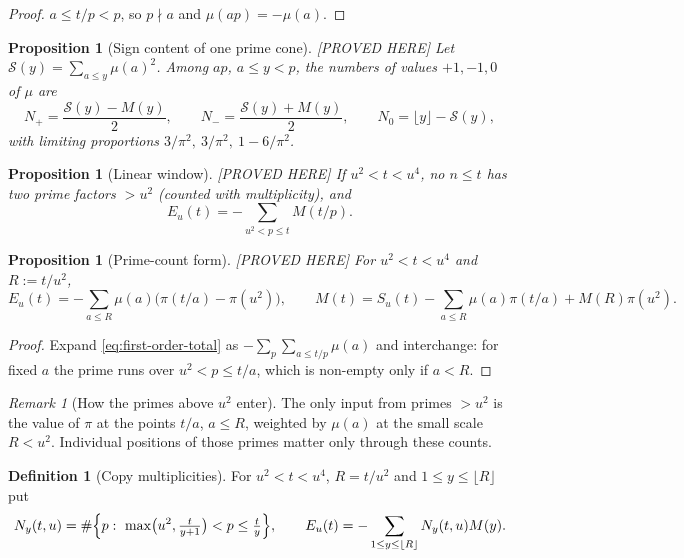 \documentclass[11pt]{amsart}
\numberwithin{equation}{section}
\theoremstyle{plain}
\newtheorem{proposition}[theorem]{Proposition}
\theoremstyle{definition}
\newtheorem{definition}[theorem]{Definition}
\theoremstyle{remark}
\newtheorem{remark}[theorem]{Remark}
\newcommand{\Sq}{\mathcal{S}}
\begin{document}
\begin{proof}
$a\le t/p<p$, so $p\nmid a$ and $\mu(ap)=-\mu(a)$.
\end{proof}

\begin{proposition}[Sign content of one prime cone]
\label{prop:prime-cone-signs}
\emph{[PROVED HERE]} Let $\Sq(y)=\sum_{a\le y}\mu(a)^2$. Among $ap$,
$a\le y<p$, the numbers of values $+1,-1,0$ of $\mu$ are
\begin{equation}
\label{eq:cone_counts}
  N_+=\frac{\Sq(y)-M(y)}{2},\qquad N_-=\frac{\Sq(y)+M(y)}{2},\qquad
  N_0=\lfloor y\rfloor-\Sq(y),
\end{equation}
with limiting proportions $3/\pi^2,\ 3/\pi^2,\ 1-6/\pi^2$.
\end{proposition}

\begin{proposition}[Linear window]
\label{prop:linear-new-primes}
\emph{[PROVED HERE]} If $u^2<t<u^4$, no $n\le t$ has two prime factors
$>u^2$ (counted with multiplicity), and
\begin{equation}
\label{eq:first-order-total}
  E_u(t)=-\sum_{u^2<p\le t}M(t/p).
\end{equation}
\end{proposition}

\begin{proposition}[Prime-count form]
\label{prop:prime_count_form}
\emph{[PROVED HERE]} For $u^2<t<u^4$ and $R:=t/u^2$,
\begin{equation}
\label{eq:prime_count_form}
  E_u(t)=-\sum_{a\le R}\mu(a)\bigl(\pi(t/a)-\pi(u^2)\bigr),
  \qquad
  M(t)=S_u(t)-\sum_{a\le R}\mu(a)\pi(t/a)+M(R)\pi(u^2).
\end{equation}
\end{proposition}

\begin{proof}
Expand \eqref{eq:first-order-total} as
$-\sum_{p}\sum_{a\le t/p}\mu(a)$ and interchange: for fixed $a$ the prime
runs over $u^2<p\le t/a$, which is non-empty only if $a<R$.
\end{proof}

\begin{remark}[How the primes above $u^2$ enter]
\label{rem:unknown_primes_enter}
The only input from primes $>u^2$ is the value of $\pi$ at the points $t/a$,
$a\le R$, weighted by $\mu(a)$ at the small scale $R<u^2$. Individual
positions of those primes matter only through these counts.
\end{remark}

\begin{definition}[Copy multiplicities]
\label{def:copy-multiplicity}
For $u^2<t<u^4$, $R=t/u^2$ and $1\le y\le\lfloor R\rfloor$ put
\begin{equation}
\label{eq:Ny-exact}
  N_y(t,u)=\#\Bigl\{p:\ \max\bigl(u^2,\tfrac{t}{y+1}\bigr)<p\le\tfrac ty\Bigr\},
  \qquad
  E_u(t)=-\sum_{1\le y\le\lfloor R\rfloor}N_y(t,u)M(y).
\end{equation}
\end{definition}
\end{document}
